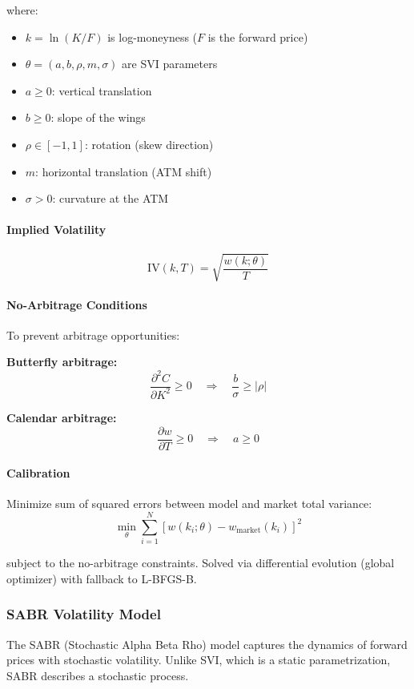 where:
\begin{itemize}
  \item $k = \ln(K/F)$ is log-moneyness ($F$ is the forward price)
  \item $\theta = (a, b, \rho, m, \sigma)$ are SVI parameters
  \item $a \geq 0$: vertical translation
  \item $b \geq 0$: slope of the wings
  \item $\rho \in [-1, 1]$: rotation (skew direction)
  \item $m$: horizontal translation (ATM shift)
  \item $\sigma > 0$: curvature at the ATM
\end{itemize}

\paragraph{Implied Volatility}

\[
\text{IV}(k, T) = \sqrt{\frac{w(k; \theta)}{T}}
\]

\paragraph{No-Arbitrage Conditions}

To prevent arbitrage opportunities:

\textbf{Butterfly arbitrage:}
\[
\frac{\partial^2 C}{\partial K^2} \geq 0 \quad \Rightarrow \quad \frac{b}{\sigma} \geq |\rho|
\]

\textbf{Calendar arbitrage:}
\[
\frac{\partial w}{\partial T} \geq 0 \quad \Rightarrow \quad a \geq 0
\]

\paragraph{Calibration}

Minimize sum of squared errors between model and market total variance:
\[
\min_{\theta} \sum_{i=1}^{N} \left[ w(k_i; \theta) - w_{\text{market}}(k_i) \right]^2
\]

subject to the no-arbitrage constraints. Solved via differential evolution (global optimizer) with fallback to L-BFGS-B.

\subsubsection{SABR Volatility Model}

The SABR (Stochastic Alpha Beta Rho) model captures the dynamics of forward prices with stochastic volatility. Unlike SVI, which is a static parametrization, SABR describes a stochastic process.

